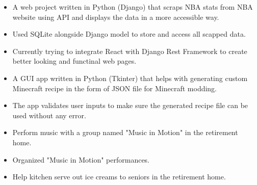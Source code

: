 \documentclass[10pt,a4paper]{altacv}
\begin{document}
\divider

\begin{itemize}
    \item A web project written in Python (Django) that scraps NBA stats from NBA website using API and displays the data in a more accessible way.
    \item Used SQLite alongside Django model to store and access all scapped data.
    \item Currently trying to integrate React with Django Rest Framework to create better looking and functinal web pages.
\end{itemize}

\divider

\begin{itemize}
	\item A GUI app written in Python (Tkinter) that helps with generating custom Minecraft recipe in the form of JSON file for Minecraft modding.
	\item The app validates user inputs to make sure the generated recipe file can be used without any error.
\end{itemize}



\begin{itemize}
    \item Perform music with a group named "Music in Motion" in the retirement home.
    \item Organized "Music in Motion" performances.
    \item Help kitchen serve out ice creams to seniors in the retirement home.
\end{itemize}



\end{document}
